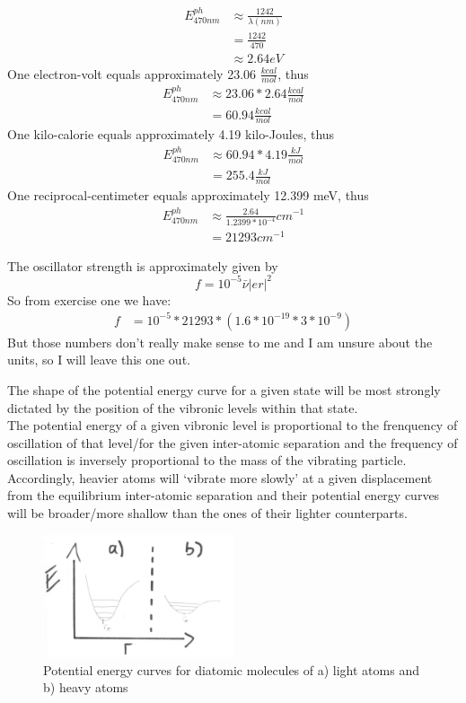 \documentclass[10pt]{article}
\begin{document}

\begin{align*}
E^{ph}_{470nm} & \approx \frac{1242}{\lambda (nm)} \\
				& = \frac{1242}{470} \\
				& \approx 2.64 eV
\end{align*}
One electron-volt equals approximately 23.06 $\frac{kcal}{mol}$, thus
\begin{align*}
E^{ph}_{470nm} & \approx 23.06*2.64\frac{kcal}{mol}\\
				& = 60.94 \frac{kcal}{mol}
\end{align*}
One kilo-calorie equals approximately 4.19 kilo-Joules, thus
\begin{align*}
E^{ph}_{470nm}& \approx 60.94 * 4.19 \frac{kJ}{mol} \\
				& = 255.4 \frac{kJ}{mol}
\end{align*}
One reciprocal-centimeter equals approximately 12.399 meV, thus
\begin{align*}
E^{ph}_{470nm} & \approx \frac{2.64}{1.2399*10^{-4}} cm^{-1} \\
				& = 21293 cm^{-1}
\end{align*}

The oscillator strength is approximately given by
\begin{equation*}
f = 10^{-5} \bar{\nu} |er|^2
\end{equation*}
So from exercise one we have:
\begin{align*}
f  	&= 10^{-5} * 21293 * (1.6 * 10^{-19}* 3 * 10^{-9})
\end{align*}
But those numbers don't really make sense to me and I am unsure about the units, so I will leave this one out.

The shape of the potential energy curve for a given state will be most strongly dictated by the position of the vibronic levels within that state.\\
The potential energy of a given vibronic level is proportional to the frenquency of oscillation of that level/for the given inter-atomic separation and the frequency of oscillation is inversely proportional to the mass of the vibrating particle. Accordingly, heavier atoms will `vibrate more slowly' at a given displacement from the equilibrium inter-atomic separation and their potential energy curves will be broader/more shallow than the ones of their lighter counterparts.
\begin{figure}
\begin{centering}
\includegraphics[width=0.5\textwidth]{f1}
\caption{Potential energy curves for diatomic molecules of a) light atoms and b) heavy atoms}
\end{centering}
\end{figure}
\end{document}
